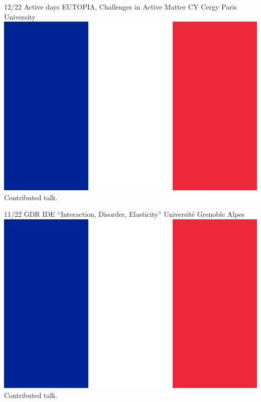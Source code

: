 \documentclass[letterpaper]{cvtemplate_en} %
\begin{document}
\begin{cvbody}

\cvitem
	{12/22}
	{}
	{Active days EUTOPIA, Challenges in Active Matter}
	{CY Cergy Paris University \includegraphics[height=0.8\myheight]{fr}\vspace{-5pt}}
	{}{}{}
	{}
	{Contributed talk.\\}

\cvitem
	{11/22}
	{}
	{GDR IDE ``Interaction, Disorder, Elasticity''}
	{Universit\'e Grenoble Alpes \includegraphics[height=0.8\myheight]{fr}}
	{}{}{}
	{}
	{Contributed talk.\\}


\end{cvbody}
\end{document}

